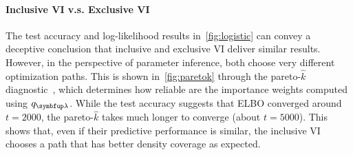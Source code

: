 \vspace{-0.1in}
\paragraph{Inclusive VI v.s. Exclusive VI}
The test accuracy and log-likelihood results in~\cref{fig:logistic} can convey a deceptive conclusion that inclusive and exclusive VI deliver similar results.
However, in the perspective of parameter inference, both choose very different optimization paths.
This is shown in~\cref{fig:paretok} through the pareto-\(\widehat{k}\) diagnostic~\citep{vehtari_pareto_2021, NEURIPS2020_7cac11e2}, which determines how reliable are the importance weights computed using \(q_{\vlambda}\).
While the test accuracy suggests that ELBO converged around \(t=2000\), the pareto-\(\widehat{k}\) takes much longer to converge (about \(t=5000\)).
This shows that, even if their predictive performance is similar, the inclusive VI chooses a path that has better density coverage as expected.

